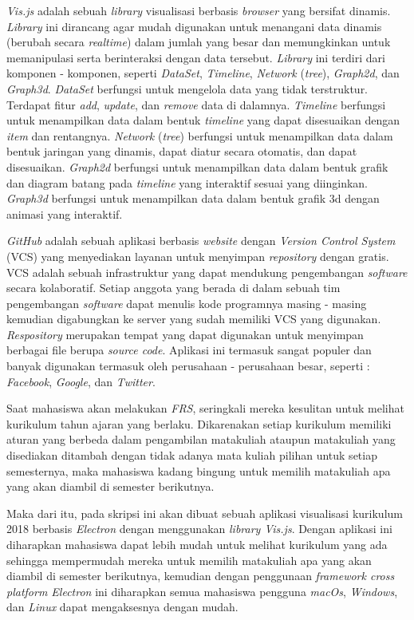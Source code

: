  \textit{Vis.js} adalah sebuah \textit{library} visualisasi berbasis \textit{browser} yang bersifat dinamis. \textit{Library} ini dirancang agar mudah digunakan untuk menangani data dinamis (berubah secara \textit{realtime}) dalam jumlah yang besar dan memungkinkan untuk memanipulasi serta berinteraksi dengan data tersebut. \textit{Library} ini terdiri dari komponen - komponen, seperti \textit{DataSet}, \textit{Timeline}, \textit{Network} (\textit{tree}), \textit{Graph2d}, dan \textit{Graph3d}. \textit{DataSet} berfungsi untuk mengelola data yang tidak terstruktur. Terdapat fitur \textit{add}, \textit{update}, dan \textit{remove} data di dalamnya. \textit{Timeline} berfungsi untuk menampilkan data dalam bentuk \textit{timeline} yang dapat disesuaikan dengan \textit{item} dan rentangnya.  \textit{Network} (\textit{tree}) berfungsi untuk menampilkan data dalam bentuk jaringan yang dinamis, dapat diatur secara otomatis, dan dapat disesuaikan. \textit{Graph2d} berfungsi untuk menampilkan data dalam bentuk grafik dan diagram batang pada \textit{timeline} yang interaktif sesuai yang diinginkan. \textit{Graph3d} berfungsi untuk menampilkan data dalam bentuk grafik 3d dengan animasi yang interaktif. 

\textit{GitHub} adalah sebuah aplikasi berbasis \textit{website} dengan \textit{Version Control System} (VCS) yang menyediakan layanan untuk menyimpan \textit{repository} dengan gratis. VCS  adalah sebuah infrastruktur yang dapat mendukung pengembangan \textit{software} secara kolaboratif. Setiap anggota yang berada di dalam sebuah tim pengembangan \textit{software} dapat menulis kode programnya masing - masing kemudian digabungkan ke server yang sudah memiliki VCS yang digunakan. \textit{Respository} merupakan tempat yang dapat digunakan untuk menyimpan berbagai file berupa \textit{source code}. Aplikasi ini termasuk sangat populer dan banyak digunakan termasuk oleh perusahaan - perusahaan besar, seperti : \textit{Facebook}, \textit{Google}, dan \textit{Twitter}.

Saat mahasiswa akan melakukan \textit{FRS}, seringkali mereka kesulitan untuk melihat kurikulum tahun ajaran yang berlaku. Dikarenakan setiap kurikulum memiliki aturan yang berbeda dalam pengambilan matakuliah ataupun matakuliah yang disediakan ditambah dengan tidak adanya mata kuliah pilihan untuk setiap semesternya, maka mahasiswa kadang bingung untuk memilih matakuliah apa yang akan diambil di semester berikutnya.

Maka dari itu, pada skripsi ini akan dibuat sebuah aplikasi visualisasi kurikulum 2018 berbasis \textit{Electron} dengan menggunakan \textit{library Vis.js}. Dengan aplikasi ini diharapkan mahasiswa dapat lebih mudah untuk melihat kurikulum yang ada sehingga mempermudah mereka untuk memilih matakuliah apa yang akan diambil di semester berikutnya, kemudian dengan penggunaan \textit{framework cross platform Electron} ini diharapkan semua mahasiswa pengguna \textit{macOs}, \textit{Windows}, dan \textit{Linux} dapat mengaksesnya dengan mudah.

